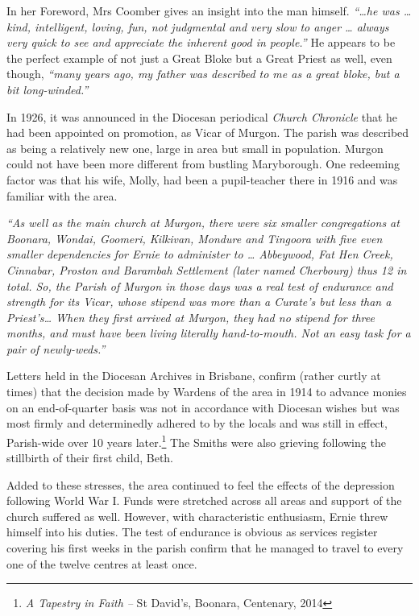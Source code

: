 In her Foreword, Mrs Coomber gives an insight into the man himself. \emph{``\ldots he was \ldots{} kind, intelligent, loving, fun, not judgmental and very slow to anger \ldots{} always very quick to see and appreciate the inherent good in people.''} He appears to be the perfect example of not just a Great Bloke but a Great Priest as well, even though, \emph{``many years ago, my father was described to me as a great bloke, but a bit long-winded.''}



In 1926, it was announced in the Diocesan periodical \emph{Church Chronicle} that he had been appointed on promotion, as Vicar of Murgon. The parish was described as being a relatively new one, large in area but small in population. Murgon could not have been more different from bustling Maryborough. One redeeming factor was that his wife, Molly, had been a pupil-teacher there in 1916 and was familiar with the area.



\emph{``As well as the main church at Murgon, there were six smaller congregations at Boonara, Wondai, Goomeri, Kilkivan, Mondure and Tingoora with five even smaller dependencies for Ernie to administer to \ldots{} Abbeywood, Fat Hen Creek, Cinnabar, Proston and Barambah Settlement (later named Cherbourg) thus 12 in total. So, the Parish of Murgon in those days was a real test of endurance and strength for its Vicar, whose stipend was more than a Curate's but less than a Priest's\ldots{} When they first arrived at Murgon, they had no stipend for three months, and must have been living literally hand-to-mouth. Not an easy task for a pair of newly-weds.''}



Letters held in the Diocesan Archives in Brisbane, confirm (rather curtly at times) that the decision made by Wardens of the area in 1914 to advance monies on an end-of-quarter basis was not in accordance with Diocesan wishes but was most firmly and determinedly adhered to by the locals and was still in effect, Parish-wide over 10 years later.\footnote{\emph{A Tapestry in Faith --} St David's, Boonara, Centenary, 2014} The Smiths were also grieving following the stillbirth of their first child, Beth.


Added to these stresses, the area continued to feel the effects of the depression following World War I. Funds were stretched across all areas and support of the church suffered as well. However, with characteristic enthusiasm, Ernie threw himself into his duties. The test of endurance is obvious as services register covering his first weeks in the parish confirm that he managed to travel to every one of the twelve centres at least once.



